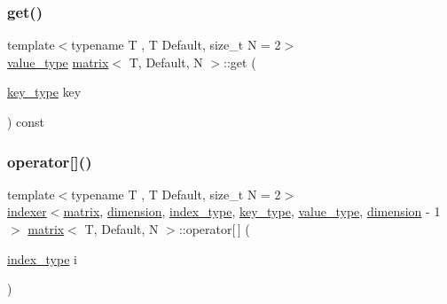 \mbox{\label{structmatrix_aad49d80cac29534744086e5e75e5d546}} 
\subsubsection{\texorpdfstring{get()}{get()}}
{\footnotesize\ttfamily template$<$typename T , T Default, size\+\_\+t N = 2$>$ \\
\hyperlink{structmatrix_aeb660563444929ee10d8a0b06d42a951}{value\+\_\+type} \hyperlink{structmatrix}{matrix}$<$ T, Default, N $>$\+::get (\begin{DoxyParamCaption}\item[{\hyperlink{structmatrix_ae7906bda02f5d7f6744d9545c9465e13}{key\+\_\+type}}]{key }\end{DoxyParamCaption}) const\hspace{0.3cm}{\ttfamily [inline]}}

\mbox{\label{structmatrix_ac66c50d40fa11e89c81197da2499fe1b}} 
\subsubsection{\texorpdfstring{operator[]()}{operator[]()}}
{\footnotesize\ttfamily template$<$typename T , T Default, size\+\_\+t N = 2$>$ \\
\hyperlink{structindexer}{indexer}$<$\hyperlink{structmatrix}{matrix}, \hyperlink{structmatrix_ad9335b977ea0dfdd152314be10591379}{dimension}, \hyperlink{structmatrix_aa800607a99454f7d958b4d6565ca9751}{index\+\_\+type}, \hyperlink{structmatrix_ae7906bda02f5d7f6744d9545c9465e13}{key\+\_\+type}, \hyperlink{structmatrix_aeb660563444929ee10d8a0b06d42a951}{value\+\_\+type}, \hyperlink{structmatrix_ad9335b977ea0dfdd152314be10591379}{dimension} -\/ 1$>$ \hyperlink{structmatrix}{matrix}$<$ T, Default, N $>$\+::operator\mbox{[}$\,$\mbox{]} (\begin{DoxyParamCaption}\item[{\hyperlink{structmatrix_aa800607a99454f7d958b4d6565ca9751}{index\+\_\+type}}]{i }\end{DoxyParamCaption})\hspace{0.3cm}{\ttfamily [inline]}}

\mbox{\label{structmatrix_ad6425b600ba5769251df32fb27a49827}} 
